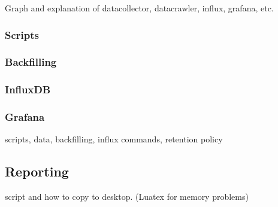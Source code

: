 Graph and explanation of datacollector, datacrawler, influx, grafana, etc.

\subsubsection{Scripts}
\subsubsection{Backfilling}
\subsubsection{InfluxDB}
\subsubsection{Grafana}

scripts, data, backfilling, influx commands, retention policy

\clearpage

\subsection{Reporting}
\label{subsec:ops_reporting}
script and how to copy to desktop. (Luatex for memory problems)


\clearpage